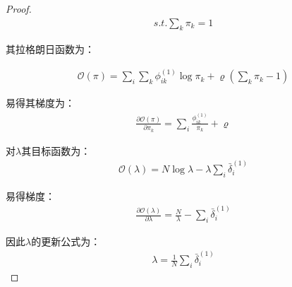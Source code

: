 \begin{proof}
	\begin{equation}
		\begin{split}
			s.t. \sum_k \pi _k = 1
		\end{split}
	\end{equation}
	
	其拉格朗日函数为：
	
	\begin{equation}
		\begin{split}
			\mathscr{O}(\pi)=\sum_i \sum_k \phi_{ik}^{(1)} \log \pi_k +\varrho(\sum_k \pi_k -1)
		\end{split}
	\end{equation}
	
	易得其梯度为：
	\begin{equation}
		\begin{split}
			\frac{\partial \mathscr{O}(\pi)}{\partial \pi_k}=\sum_i \frac{\phi_{ik}^{(1)}}{\pi_k}+\varrho
		\end{split}
	\end{equation}
	
	对$\lambda$其目标函数为：
	\begin{equation}
		\begin{split}
			\mathscr{O}(\lambda)=N \log \lambda - \lambda \sum_i \bar{\delta}_i^{(1)}
		\end{split}
	\end{equation}
	
	易得梯度：
	\begin{equation}
		\begin{split}
			\frac{\partial \mathscr{O}(\lambda)}{\partial \lambda}= \frac{N}{\lambda}-\sum_i \bar{\delta}_i^{(1)}
		\end{split}
	\end{equation}
	
	因此$\lambda$的更新公式为：
	\begin{equation}
		\begin{split}
			\lambda = \frac{1}{N} \sum_i \bar{\delta}_i^{(1)}
		\end{split}
		\label{appendix:eq:lambda}
	\end{equation}
	

\end{proof}
